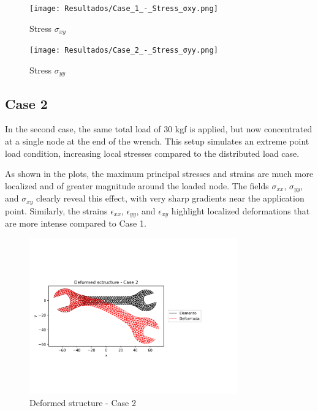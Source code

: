 \documentclass[12pt]{article}
\begin{document}
\begin{figure}[H]
    \centering
    \begin{minipage}{0.48\textwidth}
        \centering
        \texttt{[image: Resultados/Case\_1\_-\_Stress\_σxy.png]}
        \caption{Stress $\sigma_{xy}$}
        \label{fig:fig10}
    \end{minipage}
    \hfill
    \begin{minipage}{0.48\textwidth}
        \centering
        \texttt{[image: Resultados/Case\_2\_-\_Stress\_σyy.png]}
        \caption{Stress $\sigma_{yy}$}
        \label{fig:fig11}
    \end{minipage}
\end{figure}

\newpage

\subsection{Case 2}

In the second case, the same total load of 30 kgf is applied, but now concentrated at a single node at the end of the wrench.  
This setup simulates an extreme point load condition, increasing local stresses compared to the distributed load case.

As shown in the plots, the maximum principal stresses and strains are much more localized and of greater magnitude around the loaded node.  
The fields $\sigma_{xx}$, $\sigma_{yy}$, and $\sigma_{xy}$ clearly reveal this effect, with very sharp gradients near the application point.  
Similarly, the strains $\epsilon_{xx}$, $\epsilon_{yy}$, and $\epsilon_{xy}$ highlight localized deformations that are more intense compared to Case 1.

\begin{figure}[H]
    \centering
    \includegraphics[width=0.8\textwidth]{Resultados/Deformed_sctructure_-_Case_2.png}
    \caption{Deformed structure - Case 2}
    \label{fig:fig12}
\end{figure}
\end{document}
